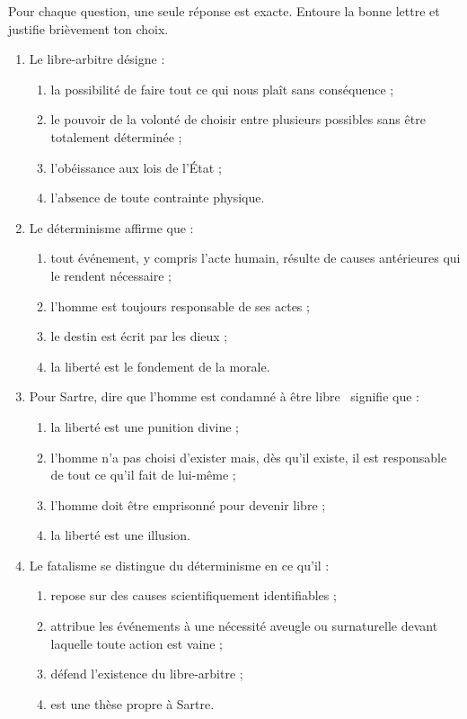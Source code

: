 \documentclass[11pt]{article}
\newcommand{\cle}[1]{{\popxbold\color{popdark}#1}}
\begin{document}
\begin{exercice}
Pour chaque question, une seule réponse est exacte. Entoure la bonne lettre et justifie brièvement ton choix.
\begin{enumerate}
\item Le \cle{libre-arbitre} désigne :
\begin{enumerate}
\item la possibilité de faire tout ce qui nous plaît sans conséquence ;
\item le pouvoir de la volonté de choisir entre plusieurs possibles sans être totalement déterminée ;
\item l'obéissance aux lois de l'État ;
\item l'absence de toute contrainte physique.
\end{enumerate}
\item Le \cle{déterminisme} affirme que :
\begin{enumerate}
\item tout événement, y compris l'acte humain, résulte de causes antérieures qui le rendent nécessaire ;
\item l'homme est toujours responsable de ses actes ;
\item le destin est écrit par les dieux ;
\item la liberté est le fondement de la morale.
\end{enumerate}
\item Pour Sartre, dire que l'homme est \guillemotleft condamné à être libre \guillemotright\ signifie que :
\begin{enumerate}
\item la liberté est une punition divine ;
\item l'homme n'a pas choisi d'exister mais, dès qu'il existe, il est responsable de tout ce qu'il fait de lui-même ;
\item l'homme doit être emprisonné pour devenir libre ;
\item la liberté est une illusion.
\end{enumerate}
\item Le \cle{fatalisme} se distingue du déterminisme en ce qu'il :
\begin{enumerate}
\item repose sur des causes scientifiquement identifiables ;
\item attribue les événements à une nécessité aveugle ou surnaturelle devant laquelle toute action est vaine ;
\item défend l'existence du libre-arbitre ;
\item est une thèse propre à Sartre.
\end{enumerate}
\end{enumerate}
\end{exercice}
\end{document}
